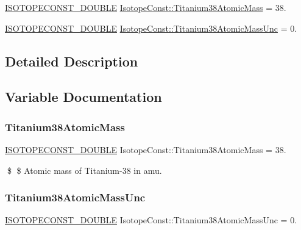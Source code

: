 \begin{DoxyCompactItemize}
\item 
\mbox{\hyperlink{group___isotope_const-_macros_ga8f45a7272ce02c0b4c65c44636ed719a}{I\+S\+O\+T\+O\+P\+E\+C\+O\+N\+S\+T\+\_\+\+D\+O\+U\+B\+LE}} \mbox{\hyperlink{group___isotope_const-_titanium-_ti38_gabdd69b2ff8a72c07e0f4fb91892e8c4b}{Isotope\+Const\+::\+Titanium38\+Atomic\+Mass}} = 38.
\item 
\mbox{\hyperlink{group___isotope_const-_macros_ga8f45a7272ce02c0b4c65c44636ed719a}{I\+S\+O\+T\+O\+P\+E\+C\+O\+N\+S\+T\+\_\+\+D\+O\+U\+B\+LE}} \mbox{\hyperlink{group___isotope_const-_titanium-_ti38_gaa602c29d816f9e39bb20db5eac1d2ac1}{Isotope\+Const\+::\+Titanium38\+Atomic\+Mass\+Unc}} = 0.
\end{DoxyCompactItemize}


\subsection{Detailed Description}


\subsection{Variable Documentation}
\mbox{\label{group___isotope_const-_titanium-_ti38_gabdd69b2ff8a72c07e0f4fb91892e8c4b}} 
\subsubsection{\texorpdfstring{Titanium38\+Atomic\+Mass}{Titanium38AtomicMass}}
{\footnotesize\ttfamily \mbox{\hyperlink{group___isotope_const-_macros_ga8f45a7272ce02c0b4c65c44636ed719a}{I\+S\+O\+T\+O\+P\+E\+C\+O\+N\+S\+T\+\_\+\+D\+O\+U\+B\+LE}} Isotope\+Const\+::\+Titanium38\+Atomic\+Mass = 38.}

\$ \$ Atomic mass of Titanium-\/38 in amu. \mbox{\label{group___isotope_const-_titanium-_ti38_gaa602c29d816f9e39bb20db5eac1d2ac1}} 
\subsubsection{\texorpdfstring{Titanium38\+Atomic\+Mass\+Unc}{Titanium38AtomicMassUnc}}
{\footnotesize\ttfamily \mbox{\hyperlink{group___isotope_const-_macros_ga8f45a7272ce02c0b4c65c44636ed719a}{I\+S\+O\+T\+O\+P\+E\+C\+O\+N\+S\+T\+\_\+\+D\+O\+U\+B\+LE}} Isotope\+Const\+::\+Titanium38\+Atomic\+Mass\+Unc = 0.}

